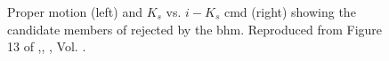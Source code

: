  \begin{figure}[ht!]
\begin{center}
\caption{Proper motion (left) and $K_s$ vs. $i-K_s$ \gls{cmd} (right) showing the candidate members of \citet{Bouy2015} rejected by the \gls{bhm}. Reproduced from Figure 13 of \citet{Olivares2017},\textit{}, , Vol. .}
\label{fig:rejecteds}
\end{center}
\end{figure}

